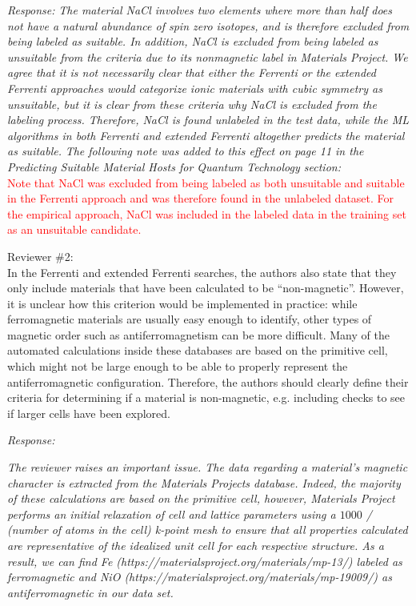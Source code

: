 \documentclass[11pt, a4paper]{letter} %
\newcommand{\mrk}[1]{\textcolor{red}{#1}}
\begin{document}
\textit{Response:} 
\textit{The material NaCl involves two elements where more than half does not have a natural abundance of spin zero isotopes, and is therefore excluded from being labeled as suitable. In addition, NaCl is excluded from being labeled as unsuitable from the criteria due to its nonmagnetic label in Materials Project. We agree that it is not necessarily clear that either the Ferrenti or the extended Ferrenti approaches would categorize ionic materials with cubic symmetry as unsuitable, but it is clear from these criteria why NaCl is excluded from the labeling process. Therefore, NaCl is found unlabeled in the test data, while the ML algorithms in both Ferrenti and extended Ferrenti altogether predicts the material as suitable.}  
\textit{The following note was added to this effect on page 11 in the Predicting Suitable Material Hosts for Quantum Technology section:} \\ 
\mrk{Note that NaCl was excluded from being labeled as both unsuitable and suitable in the Ferrenti approach and was therefore found in the unlabeled dataset. For the empirical approach, NaCl was included in the labeled data in the training set as an unsuitable candidate. }

Reviewer \#2: \\
In the Ferrenti and extended Ferrenti searches, the authors also state that they only include materials that have been calculated to be “non-magnetic”. However, it is unclear how this criterion would be implemented in practice: while ferromagnetic materials are usually easy enough to identify, other types of magnetic order such as antiferromagnetism can be more difficult. Many of the automated calculations inside these databases are based on the primitive cell, which might not be large enough to be able to properly represent the antiferromagnetic configuration. Therefore, the authors should clearly define their criteria for determining if a material is non-magnetic, e.g. including checks to see if larger cells have been explored.

\textit{Response:}

\textit{The reviewer raises an important issue. 
The data regarding a material's magnetic character is extracted from the Materials Projects database. Indeed, the majority of these calculations are based on the primitive cell, however, Materials Project performs an initial relaxation of cell and lattice parameters using a $1000$ / (number of atoms in the cell) k-point mesh to ensure that all properties calculated are representative of the idealized unit cell for each respective structure. As a result, we can find Fe (https://materialsproject.org/materials/mp-13/) labeled as ferromagnetic and NiO (https://materialsproject.org/materials/mp-19009/) as antiferromagnetic in our data set.} 
\end{document}
